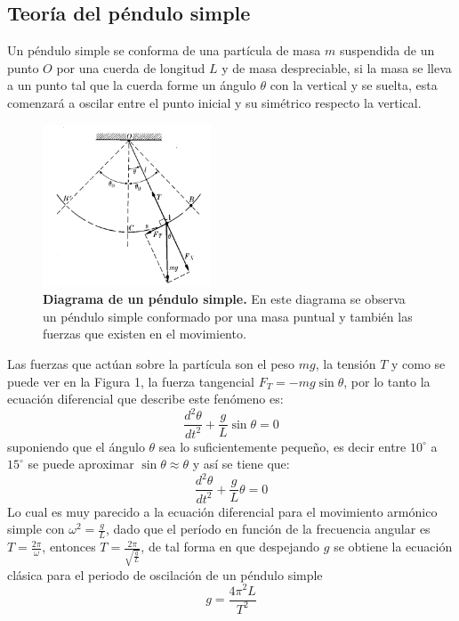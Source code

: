 \documentclass[DIV=calc, paper=a4, fontsize=11pt]{scrartcl}
\begin{document}
\subsection*{\textcolor{carmine}{Teoría del péndulo simple}}
Un péndulo simple se conforma de una partícula de masa $m$ suspendida de un punto $O$ por una cuerda de longitud $L$ y de masa despreciable, si la masa se lleva a un punto tal que la cuerda forme un ángulo $\theta$ con la vertical y se suelta, esta comenzará a oscilar entre el punto inicial y su simétrico respecto la vertical\cite{Finn}.
\begin{figure}[]
    \centering
    \includegraphics[width=5cm]{pendulo.PNG}
    \caption{{\textbf{Diagrama de un péndulo simple.} En este diagrama se observa un péndulo simple conformado por una masa puntual y también las fuerzas que existen en el movimiento.\cite{Finn}}}
    \label{fig:my_label}
\end{figure}
Las fuerzas que actúan sobre la partícula son el peso $mg$, la tensión $T$ y como se puede ver en la Figura 1, la fuerza tangencial $F_T = -mg \sin{\theta}$, por lo tanto la ecuación diferencial que describe este fenómeno es:
\begin{equation}
    \frac{d^2 \theta}{d t^2} + \frac{g}{L} \sin{\theta} = 0
\end{equation}
\noindent suponiendo que el ángulo $\theta$ sea lo suficientemente pequeño, es decir entre $10^{\circ}$ a $15^{\circ}$ se puede aproximar $\sin{\theta} \approx \theta$ y así se tiene que\cite{Finn}:
\begin{equation}
    \frac{d^2 \theta}{d t^2} + \frac{g}{L} \theta = 0
\end{equation}
Lo cual es muy parecido a la ecuación diferencial para el movimiento armónico simple con $\omega ^2 = \frac{g}{L}$, dado que el período en función de la frecuencia angular es $T =\frac{ 2 \pi} {\omega}$, entonces $T= \frac{2\pi} {\sqrt{\frac{g}{L}}}$, de tal forma en que despejando $g$ se obtiene la ecuación clásica para el periodo de oscilación de un péndulo simple
\begin{equation}
    g = \frac{4 \pi^2 L}{T^2}
\end{equation}
\end{document}
